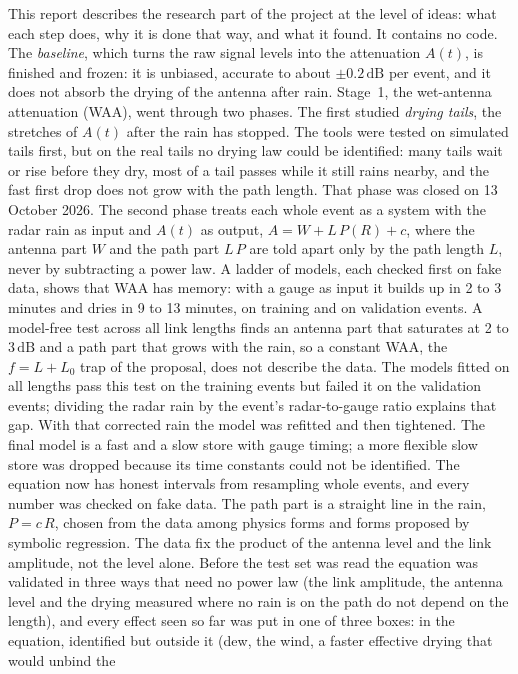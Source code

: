 \documentclass[11pt,a4paper]{article}
\newcommand{\dB}{\,\mathrm{dB}}
\begin{document}
This report describes the research part of the project at the level of ideas: what each step does, why it is done
that way, and what it found. It contains no code. The \emph{baseline}, which turns the raw signal levels into the
attenuation $A(t)$, is finished and frozen: it is unbiased, accurate to about $\pm 0.2\dB$ per event, and it does not
absorb the drying of the antenna after rain. Stage~1, the wet-antenna attenuation (WAA), went through two phases. The
first studied \emph{drying tails}, the stretches of $A(t)$ after the rain has stopped. The tools were tested on
simulated tails first, but on the real tails no drying law could be identified: many tails wait or rise before they
dry, most of a tail passes while it still rains nearby, and the fast first drop does not grow with the path length.
That phase was closed on 13 October 2026. The second phase treats each whole event as a system with the radar rain as
input and $A(t)$ as output, $A = W + L\,P(R) + c$, where the antenna part $W$ and the path part $L\,P$ are told apart
only by the path length $L$, never by subtracting a power law. A ladder of models, each checked first on fake data,
shows that WAA has memory: with a gauge as input it builds up in 2 to 3 minutes and dries in 9 to 13 minutes, on
training and on validation events. A model-free test across all link lengths finds an antenna part that saturates at
2 to 3$\dB$ and a path part that grows with the rain, so a constant WAA, the $f = L + L_{0}$ trap of the proposal, does
not describe the data. The models fitted on all lengths pass this test on the training events but failed it on the
validation events; dividing the radar rain by the event's radar-to-gauge ratio explains that gap. With that corrected
rain the model was refitted and then tightened. The final model is a fast and a slow store with gauge timing; a more
flexible slow store was dropped because its time constants could not be identified. The equation now has honest
intervals from resampling whole events, and every number was checked on fake data. The path part is a straight line
in the rain, $P = c\,R$, chosen from the data among physics forms and forms proposed by symbolic regression. The
data fix the product of the antenna level and the link amplitude, not the level alone. Before the test set was read
the equation was validated in three ways that need no power law (the link amplitude, the antenna level and the drying
measured where no rain is on the path do not depend on the length), and every effect seen so far was put in one of
three boxes: in the equation, identified but outside it (dew, the wind, a faster effective drying that would unbind the
\end{document}
